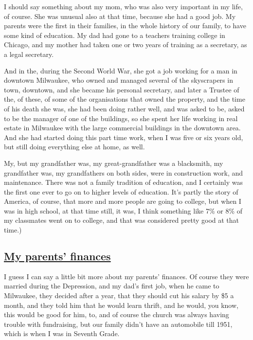 \documentclass[]{article}
\begin{document}
I should say something about my mom, who was also very important in my
life, of course. She was unusual also at that time, because she had a
good job. My parents were the first in their families, in the whole
history of our family, to have some kind of education. My dad had gone
to a teachers training college in Chicago, and my mother had taken one
or two years of training as a secretary, as a legal secretary.

And in the, during the Second World War, she got a job working for a man
in downtown Milwaukee, who owned and managed several of the skyscrapers
in town, downtown, and she became his personal secretary, and later a
Trustee of the, of these, of some of the organisations that owned the
property, and the time of his death she was, she had been doing rather
well, and was asked to be, asked to be the manager of one of the
buildings, so she spent her life working in real estate in Milwaukee
with the large commercial buildings in the downtown area. And she had
started doing this part time work, when I was five or six years old, but
still doing everything else at home, as well.

My, but my grandfather was, my great-grandfather was a blacksmith, my
grandfather was, my grandfathers on both sides, were in construction
work, and maintenance. There was not a family tradition of education,
and I certainly was the first one ever to go on to higher levels of
education. It's partly the story of America, of course, that more and
more people are going to college, but when I was in high school, at that
time still, it was, I think something like 7\% or 8\% of my classmates
went on to college, and that was considered pretty good at that time.)

\subsection{\texorpdfstring{\href{http://webofstories.com/play/17063}{My
parents' finances}}{My parents' finances}}\label{my-parents-finances}

I guess I can say a little bit more about my parents' finances. Of
course they were married during the Depression, and my dad's first job,
when he came to Milwaukee, they decided after a year, that they should
cut his salary by \$5 a month, and they told him that he would learn
thrift, and he would, you know, this would be good for him, to, and of
course the church was always having trouble with fundraising, but our
family didn't have an automobile till 1951, which is when I was in
Seventh Grade.
\end{document}
